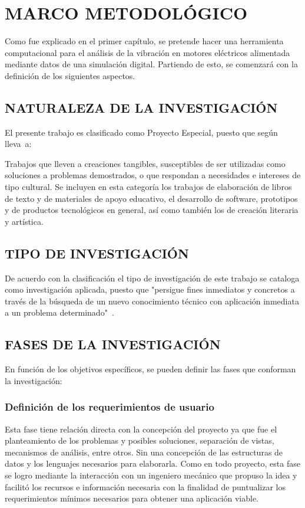 \thispagestyle{empty}

\section{MARCO METODOLÓGICO}

Como fue explicado en el primer capítulo, se pretende hacer una herramienta
computacional para el análisis de la vibración en motores eléctricos alimentada
mediante datos de una simulación digital. Partiendo de esto, se comenzará
con la definición de los siguientes aspectos.

\subsection{NATURALEZA DE LA INVESTIGACIÓN}

El presente trabajo es clasificado como Proyecto Especial, puesto que según
\textcite{Hernandez} lleva~a:

\begin{center}
    \parbox[ht]{13.5 cm}{Trabajos que lleven a creaciones tangibles,
    susceptibles de ser utilizadas como soluciones a problemas demostrados, o
    que respondan a necesidades e intereses de tipo cultural. Se incluyen en
    esta categoría los trabajos de elaboración de libros de texto y de
    materiales de apoyo educativo, el desarrollo de software, prototipos y de
    productos tecnológicos en general, así como también los de creación
    literaria y artística.}
\end{center}


\subsection{TIPO DE INVESTIGACIÓN}

De acuerdo con la clasificación el tipo de investigación de este trabajo se
cataloga como investigación aplicada, puesto que "persigue fines inmediatos y
concretos a través de la búsqueda de un nuevo conocimiento técnico con aplicación
inmediata a un problema determinado"\ \textcite{Velez}.

\subsection{FASES DE LA INVESTIGACIÓN}

En función de los objetivos específicos, se pueden definir las fases que conforman
la investigación:

\subsubsection{Definición de los requerimientos de usuario}
Esta fase tiene relación directa con la concepción del proyecto ya que fue el
planteamiento de los problemas y posibles soluciones, separación de vistas,
mecanismos de análisis, entre otros. Sin una concepción  de las estructuras
de datos y los lenguajes necesarios para elaborarla.
Como en todo proyecto, esta fase se logro mediante la interacción con un ingeniero
mecánico que propuso la idea y facilitó los recursos e información necesaria
con la finalidad de puntualizar los requerimientos
mínimos necesarios para obtener una aplicación viable.

